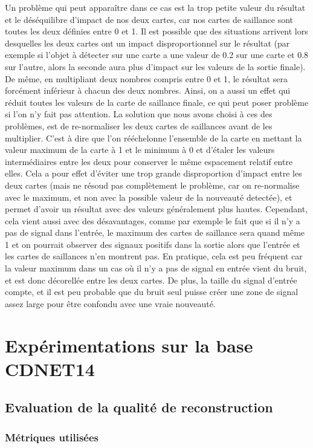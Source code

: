 	Un problème qui peut apparaître dans ce cas est la trop petite valeur du résultat et le déséquilibre d'impact de nos deux cartes, car nos cartes de saillance sont toutes les deux définies entre 0 et 1. Il est possible que des situations arrivent lors desquelles les deux cartes ont un impact disproportionnel sur le résultat (par exemple si l'objet à détecter sur une carte a une valeur de 0.2 sur une carte et 0.8 sur l'autre, alors la seconde aura plus d'impact sur les valeurs de la sortie finale). De même, en multipliant deux nombres compris entre 0 et 1, le résultat sera forcément inférieur à chacun des deux nombres. Ainsi, on a aussi un effet qui réduit toutes les valeurs de la carte de saillance finale, ce qui peut poser problème si l'on n'y fait pas attention. La solution que nous avons choisi à ces des problèmes, est de re-normaliser les deux cartes de saillances avant de les multiplier. C'est à dire que l'on rééchelonne l'ensemble de la carte en mettant la valeur maximum de la carte à 1 et le minimum à 0 et d'étaler les valeurs intermédiaires entre les deux pour conserver le même espacement relatif entre elles. Cela a pour effet d'éviter une trop grande disproportion d'impact entre les deux cartes (mais ne résoud pas complètement le problème, car on re-normalise avec le maximum, et non avec la possible valeur de la nouveauté detectée), et permet d'avoir un résultat avec des valeurs généralement plus hautes. Cependant, cela vient aussi avec des désavantages, comme par exemple le fait que si il n'y a pas de signal dans l'entrée, le maximum des cartes de saillance sera quand même 1 et on pourrait observer des signaux positifs dans la sortie alors que l'entrée et les cartes de saillances n'en montrent pas. En pratique, cela est peu fréquent car la valeur maximum dans un cas où il n'y a pas de signal en entrée vient du bruit, et est donc décorellée entre les deux cartes. De plus, la taille du signal d'entrée compte, et il est peu probable que du bruit seul puisse créer une zone de signal assez large pour être confondu avec une vraie nouveauté.

	\newpage
	\section{Expérimentations sur la base CDNET14}
	\subsection{Evaluation de la qualité de reconstruction}
	\subsubsection{Métriques utilisées}
